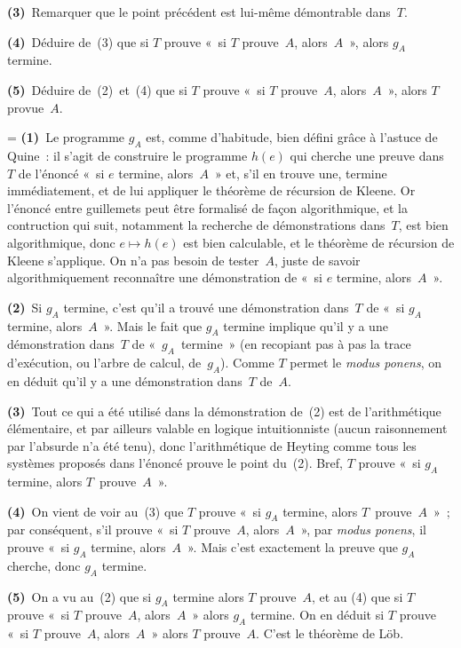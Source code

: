 \documentclass[12pt,a4paper]{article}
\theoremstyle{definition}
\newif\ifcorrige
\newenvironment{corrige}%
{\ifcorrige\relax\else\setbox0=\vbox\bgroup\fi%
\smallbreak\footnotesize\noindent{\underbar{\textit{Corrigé.}}\quad}}
{{\hbox{}\nobreak\hfill\checkmark}%
\ifcorrige\relax\else\egroup\fi\par}
\begin{document}
\textbf{(3)} Remarquer que le point précédent est lui-même démontrable
dans $T$.

\textbf{(4)} Déduire de (3) que si $T$ prouve « si $T$ prouve $A$,
alors $A$ », alors $g_A$ termine.

\textbf{(5)} Déduire de (2) et (4) que si $T$ prouve « si $T$
prouve $A$, alors $A$ », alors $T$ provue $A$.

\begin{corrige}
\textbf{(1)} Le programme $g_A$ est, comme d'habitude, bien défini
grâce à l'astuce de Quine : il s'agit de construire le programme
$h(e)$ qui cherche une preuve dans $T$ de l'énoncé « si $e$ termine,
alors $A$ » et, s'il en trouve une, termine immédiatement, et de lui
appliquer le théorème de récursion de Kleene.  Or l'énoncé entre
guillemets peut être formalisé de façon algorithmique, et la
contruction qui suit, notamment la recherche de démonstrations
dans $T$, est bien algorithmique, donc $e \mapsto h(e)$ est bien
calculable, et le théorème de récursion de Kleene s'applique.  On n'a
pas besoin de tester $A$, juste de savoir algorithmiquement
reconnaître une démonstration de « si $e$ termine, alors $A$ ».

\textbf{(2)} Si $g_A$ termine, c'est qu'il a trouvé une démonstration
dans $T$ de « si $g_A$ termine, alors $A$ ».  Mais le fait que $g_A$
termine implique qu'il y a une démonstration dans $T$ de
« $g_A$ termine » (en recopiant pas à pas la trace d'exécution, ou
l'arbre de calcul, de $g_A$).  Comme $T$ permet le \textit{modus
  ponens}, on en déduit qu'il y a une démonstration dans $T$ de $A$.

\textbf{(3)} Tout ce qui a été utilisé dans la démonstration de (2)
est de l'arithmétique élémentaire, et par ailleurs valable en logique
intuitionniste (aucun raisonnement par l'absurde n'a été tenu), donc
l'arithmétique de Heyting comme tous les systèmes proposés dans
l'énoncé prouve le point du (2).  Bref, $T$ prouve « si $g_A$ termine,
alors $T$ prouve $A$ ».

\textbf{(4)} On vient de voir au (3) que $T$ prouve « si $g_A$
termine, alors $T$ prouve $A$ » ; par conséquent, s'il prouve « si $T$
prouve $A$, alors $A$ », par \textit{modus ponens}, il prouve « si
$g_A$ termine, alors $A$ ».  Mais c'est exactement la preuve que $g_A$
cherche, donc $g_A$ termine.

\textbf{(5)} On a vu au (2) que si $g_A$ termine alors $T$ prouve $A$,
et au (4) que si $T$ prouve « si $T$ prouve $A$, alors $A$ » alors
$g_A$ termine.  On en déduit si $T$ prouve « si $T$ prouve $A$,
alors $A$ » alors $T$ prouve $A$.  C'est le théorème de Löb.
\end{corrige}
\end{document}
